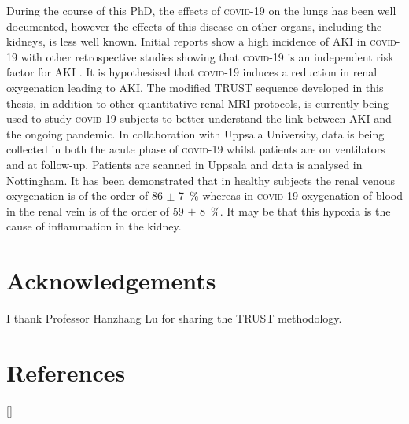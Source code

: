 During the course of this PhD, the effects of \textsc{covid}-19 on the lungs has been well documented, however the effects of this disease on other organs, including the kidneys, is less well known. Initial reports show a high incidence of \ac{AKI} in \textsc{covid}-19 \cite{selby_covid-19_2020, fisher_aki_2020, gabarre_acute_2020} with other retrospective studies showing that \textsc{covid}-19 is an independent risk factor for \ac{AKI} \cite{kolhe_acute_2020-1, adapa_covid-19_2020}. It is hypothesised that \textsc{covid}-19 induces a reduction in renal oxygenation leading to \ac{AKI}. The modified \ac{TRUST} sequence developed in this thesis, in addition to other quantitative renal \ac{MRI} protocols, is currently being used to study \textsc{covid}-19 subjects to better understand the link between \ac{AKI} and the ongoing pandemic. In collaboration with Uppsala University, data is being collected in both the acute phase of \textsc{covid}-19 whilst patients are on ventilators and at follow-up. Patients are scanned in Uppsala and data is analysed in Nottingham. It has been demonstrated that in healthy subjects the renal venous oxygenation is of the order of 86 $\pm$ 7~\% whereas in \textsc{covid}-19 oxygenation of blood in the renal vein is of the order of 59 $\pm$ 8~\%. It may be that this hypoxia is the cause of inflammation in the kidney.

\section{Acknowledgements}

I thank Professor Hanzhang Lu for sharing the TRUST methodology.

\newpage
\section{References}
[\refname]{}
\printbibliography